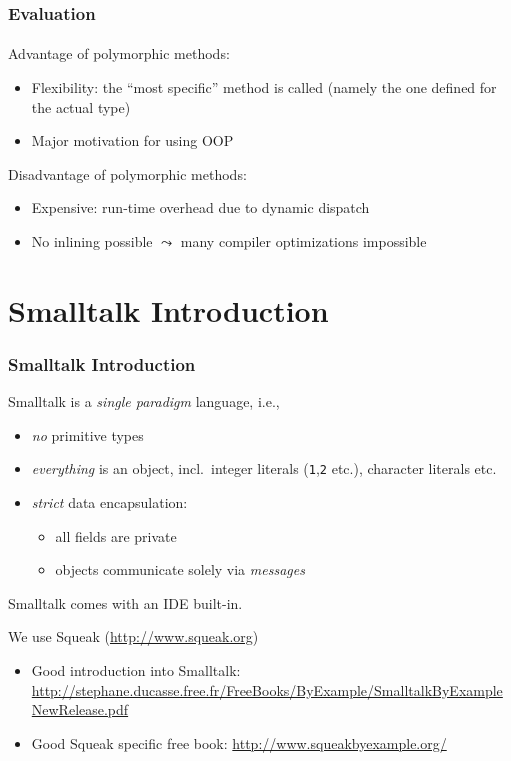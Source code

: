 \documentclass{beamer}
\begin{document}
\begin{frame}[fragile]
\frametitle{Evaluation}
\framesubtitle{}
Advantage of polymorphic methods: 
\begin{itemize}
\item Flexibility: the ``most specific'' method is called
(namely the one defined for the actual type)
\item Major motivation for using OOP
\end{itemize}
\bigskip

Disadvantage of polymorphic methods: 
\begin{itemize}
\item Expensive: run-time overhead due to dynamic dispatch
\item No inlining possible $\leadsto$ many compiler optimizations
impossible
\end{itemize}

\end{frame}





\section{Smalltalk Introduction}

\begin{frame}[fragile]
\frametitle{Smalltalk Introduction}

Smalltalk is a \emph{single paradigm} language, i.e.,
\begin{itemize}
  \item \emph{no} primitive types 
  \item \emph{everything} is an object, incl.\ integer
    literals (\texttt{1},\texttt{2} etc.), character literals etc.
  \item \emph{strict} data encapsulation:
    \begin{itemize}
    \item all fields are private
    \item objects communicate solely via \emph{messages}
    \end{itemize}
\end{itemize}

\bigskip\pause

Smalltalk comes with an IDE built-in.

\bigskip

We use Squeak (\url{http://www.squeak.org})

\begin{itemize}
  \item Good introduction into Smalltalk: \url{http://stephane.ducasse.free.fr/FreeBooks/ByExample/SmalltalkByExampleNewRelease.pdf}
  \item Good Squeak specific free book: \url{http://www.squeakbyexample.org/}
\end{itemize}

\end{frame}
\end{document}
